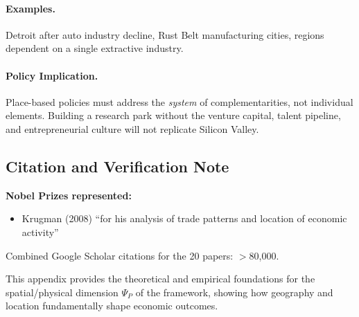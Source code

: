 \paragraph{Examples.}
Detroit after auto industry decline, Rust Belt manufacturing cities,
regions dependent on a single extractive industry.

\paragraph{Policy Implication.}
Place-based policies must address the \textit{system} of complementarities,
not individual elements. Building a research park without the venture capital,
talent pipeline, and entrepreneurial culture will not replicate Silicon Valley.

\subsection{Citation and Verification Note}

\textbf{Nobel Prizes represented:}
\begin{itemize}
    \item Krugman (2008) ``for his analysis of trade patterns and location of economic activity''
\end{itemize}

Combined Google Scholar citations for the 20 papers: $>$80,000.

This appendix provides the theoretical and empirical foundations for the 
spatial/physical dimension $\Psi_P$ of the framework, showing how geography 
and location fundamentally shape economic outcomes.

